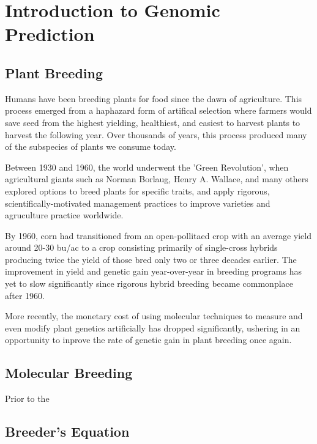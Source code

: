 \chapter{Introduction to Genomic Prediction}

\section{Plant Breeding}

Humans have been breeding plants for food since the dawn of agriculture. This process
emerged from a haphazard form of artifical selection where farmers would save seed from the 
highest yielding, healthiest, and easiest to harvest plants to harvest the following year. 
Over thousands of years, this process produced many of the subspecies of plants we consume today. 

Between 1930 and 1960, the world underwent the 'Green Revolution', when agricultural giants such
as Norman Borlaug, Henry A. Wallace, and many others explored options to breed plants for
specific traits, and apply rigorous, scientifically-motivated management practices to improve
varieties and agruculture practice worldwide.

By 1960, corn had transitioned from an open-pollitaed crop with an average yield around 20-30 bu/ac
to a crop consisting primarily of single-cross hybrids producing twice the yield of those bred 
only two or three decades earlier. The improvement in yield and genetic gain year-over-year in
breeding programs has yet to slow significantly since rigorous hybrid breeding became 
commonplace after 1960.

More recently, the monetary cost of using molecular techniques to measure and even modify plant
genetics artificially has dropped significantly, ushering in an opportunity to inprove 
the rate of genetic gain in plant breeding once again.

\section{Molecular Breeding}

Prior to the 

\section{Breeder's Equation}

